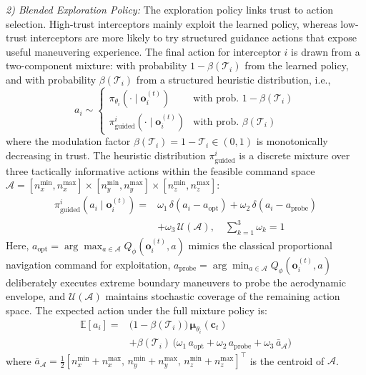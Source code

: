 \documentclass[lettersize,journal]{IEEEtran}
\begin{document}
\emph{2) Blended Exploration Policy:} The exploration policy links trust to action selection. High-trust interceptors mainly exploit the learned policy, whereas low-trust interceptors are more likely to try structured guidance actions that expose useful maneuvering experience. The final action for interceptor $i$ is drawn from a two-component mixture: with probability $1-\beta(\mathcal{T}_i)$ from the learned policy, and with probability $\beta(\mathcal{T}_i)$ from a structured heuristic distribution, i.e.,
\begin{equation}
\label{eq:exploration_policy}
a_i \sim \begin{cases} \pi_{\theta_i}(\cdot \mid \mathbf{o}_i^{(t)}) & \text{with prob. } 1 - \beta(\mathcal{T}_i) \\ \pi_{\mathrm{guided}}^{i}(\cdot \mid \mathbf{o}_i^{(t)}) & \text{with prob. } \beta(\mathcal{T}_i) \end{cases}
\end{equation}
where the modulation factor $\beta(\mathcal{T}_i) = 1 - \mathcal{T}_i \in (0,1)$ is monotonically decreasing in trust. The heuristic distribution $\pi_{\mathrm{guided}}^{i}$ is a discrete mixture over three tactically informative actions within the feasible command space
\(\mathcal{A}=[n_x^{\min},n_x^{\max}]\times
[n_y^{\min},n_y^{\max}]\times[n_z^{\min},n_z^{\max}]\):
\begin{equation}
\label{eq:guided}
\begin{split}
\pi_{\mathrm{guided}}^{i}(a_i \mid \mathbf{o}_i^{(t)}) =& \omega_1\,\delta(a_i - a_{\mathrm{opt}}) + \omega_2\,\delta(a_i - a_{\mathrm{probe}}) \\
&+ \omega_3\,\mathcal{U}(\mathcal{A}), \quad \sum_{k=1}^3\omega_k=1
\end{split}
\end{equation}
Here, $a_{\mathrm{opt}} = \arg\max_{a \in \mathcal{A}} Q_\phi(\mathbf{o}_i^{(t)}, a)$ mimics the classical proportional navigation command for exploitation, $a_{\mathrm{probe}} = \arg\min_{a \in \mathcal{A}} Q_\phi(\mathbf{o}_i^{(t)}, a)$ deliberately executes extreme boundary maneuvers to probe the aerodynamic envelope, and $\mathcal{U}(\mathcal{A})$ maintains stochastic coverage of the remaining action space. The expected action under the full mixture policy is:
\begin{equation}
\label{eq:expected_action}
\begin{split}
\mathbb{E}[a_i] =& \bigl(1-\beta(\mathcal{T}_i)\bigr)\,\boldsymbol{\mu}_{\theta_i}(\mathbf{c}_t) \\
&+ \beta(\mathcal{T}_i)\,\bigl(\omega_1\,a_{\mathrm{opt}} + \omega_2\,a_{\mathrm{probe}} + \omega_3\,\bar{a}_{\mathcal{A}}\bigr)
\end{split}
\end{equation}
where
\(\bar{a}_{\mathcal{A}}=\frac{1}{2}
[n_x^{\min}+n_x^{\max},\,n_y^{\min}+n_y^{\max},\,
n_z^{\min}+n_z^{\max}]^\top\) is the centroid of \(\mathcal{A}\).
\end{document}
